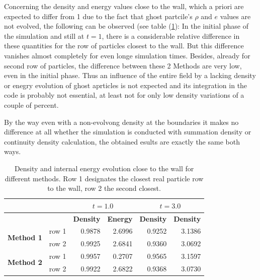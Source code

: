 \documentclass{report}
\begin{document}
Concerning the density and energy values close to the wall, which a priori are expected to differ from 1 due to the fact that ghost partcile's $\rho$ and $e$ values are not evolved, the following can be observed (see table (\ref{tab:2DSPH_LinearWall_Poiseuille_WallErrorsRho_e}): In the initial phase of the simulation and still at $t=1$, there is a considerable relative difference in these quantities for the row of particles closest to the wall. But this difference vanishes almost completely for even longe simulation times. Besides, already for second row of particles, the difference between these 2 Methods are very low, even in the initial phase.
Thus an influence of the entire field by a lacking density or enegry evolution of ghost aprticles is not expected and its integration in the code is probably not essential, at least not for only low density variations of a couple of percent. 

By the way even with a non-evolvong density at the boundaries it makes no difference at all whether the simulation is conducted with summation density or continuity density calculation, the obtained esults are exactly the same both ways.

\begin{table}[h] %
\label{tab:2DSPH_LinearWall_Poiseuille_WallErrorsRho_e}
\centering
\begin{tabular}[c]{||c||l||r|r||r|r||} %
\hline
&&\multicolumn{2}{|c|}{\textbf{$t=1.0$}}& \multicolumn{2}{|c|}{\textbf{$t=3.0$}}\\
\hline
 &&{\bf Density} & {\bf Energy} & {\bf Density}& {\bf Density}\\
\hline
\hline
\multirow{2}{*}{{\bf Method 1}} &row 1&0.9878 & 2.6996 & 0.9252& 3.1386 \\
\hline
&row 2&0.9925 &2.6841 &0.9360 & 3.0692\\
\hline
\multirow{2}{*}{{\bf Method 2}}&row 1&0.9957 & 0.2707& 0.9565 & 3.1597 \\
\hline
&row 2&0.9922 & 2.6822 & 0.9368&3.0730 \\
\hline
\hline
\end{tabular}
\caption[]{Density and internal energy evolution close to the wall for different methods. Row 1 designates the closest real particle row to the wall, row 2 the second closest.}
\end{table}
\end{document}
